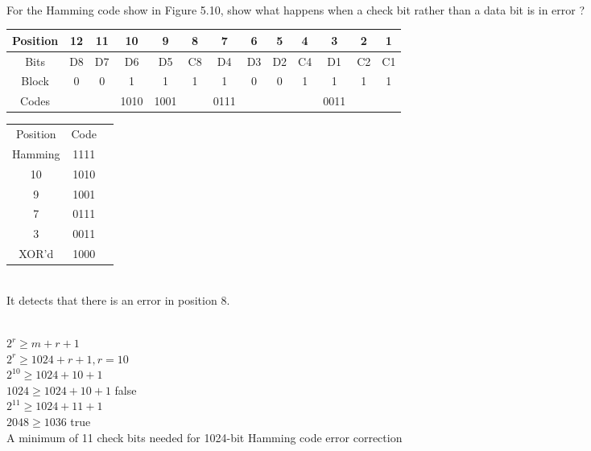 \documentclass[12pt,largemargins]{homework}
\date{Septemeber 6, 2018}
\begin{document}
\maketitle
{}\\
For the Hamming code show in Figure 5.10, show what happens when a check bit rather than a data bit is in error ?\\
\begin{center}
	\begin{tabular}{|c|c|c|c|c|c|c|c|c|c|c|c|c|}
		\hline
		Position & 12 & 11 & 10 & 9 & 8 & 7 & 6 & 5 & 4 & 3 & 2 & 1\\
		\hline 
		Bits  & D8  & D7 & D6 & D5 & C8 & D4 & D3 & D2 & C4 & D1 & C2 & C1\\
		\hline
		Block  & 0 & 0 & 1 & 1 & 1 & 1 & 0 & 0 & 1 & 1 & 1 & 1\\
		\hline
		Codes  & & & 1010 & 1001  &  & 0111 & & & & 0011 & & \\
		\hline 
	\end{tabular}
	
	\begin{tabular}{|c|c|c|}
		\hline
		Position & Code\\
		Hamming & 1111\\
		10 & 1010\\
		9 & 1001\\
		7 & 0111\\
		3 & 0011\\
		XOR'd & 1000\\
		\hline
	\end{tabular}\\
	It detects that there is an error in position 8.\\
\end{center}

\\
$ 2^r \geq m + r+ 1 $\\
$ 2^r \geq 1024 + r + 1, r=10$\\
$ 2^10 \geq 1024 + 10 + 1 $\\
$ 1024 \geq 1024 +10 +1 $ false\\
$ 2^11 \geq 1024 +11 +1 $\\
$ 2048 \geq 1036 $ true \\
A minimum of 11 check bits needed for 1024-bit Hamming code error correction
\end{document}
